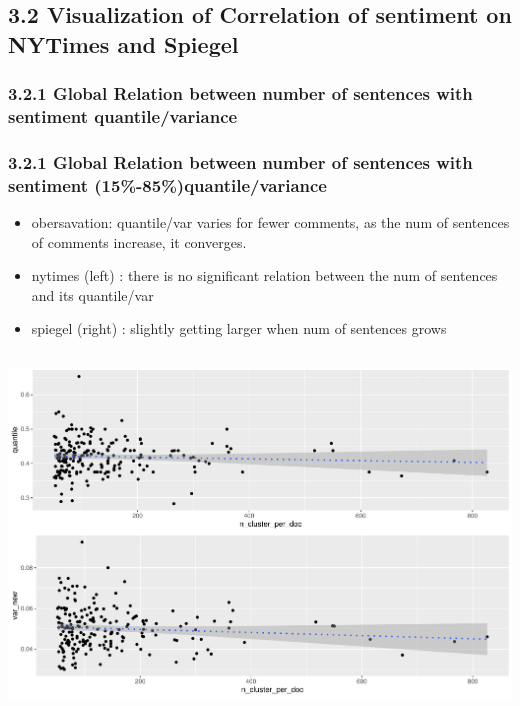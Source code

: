 \documentclass{tum-presentation}
\begin{document}
\subsection{3.2 Visualization of Correlation of sentiment on NYTimes and Spiegel }
\begin{frame}[shrink]
  \tableofcontents[currentsection,hideallsubsections,sectionstyle=show/shaded,subsectionstyle=show/shaded/hide]
\end{frame}

\subsubsection{3.2.1 Global Relation between number of sentences with sentiment quantile/variance }
\begin{frame}
  \frametitle{3.2.1 Global Relation between number of sentences with sentiment (15\%-85\%)quantile/variance }
  \begin{itemize}
    \item obersavation: quantile/var varies for fewer comments, as the num of sentences of comments increase, it converges.
    \item nytimes (left) : there is no significant relation between the num of sentences and its quantile/var
    \item spiegel (right) : slightly getting larger when num of sentences grows
 \end{itemize}
  \begin{columns}
    \begin{minipage}[c]{\linewidth}
        \centering
        \includegraphics[width=0.95\linewidth]{figures/num_commentsentences_var_quantileny_1585_cluster_weight.pdf}
    \end{minipage}

\end{columns}
\end{frame}
\end{document}
